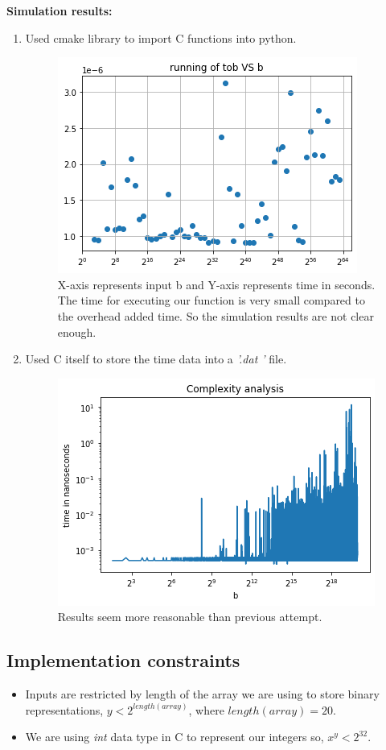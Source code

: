 \documentclass[journal,12pt,twocolumn]{IEEEtran}
\begin{document}
\textbf{Simulation results:} 
\begin{enumerate}
    \item Used cmake library to import C functions into python.
    \begin{figure}[]
        \centering
        \includegraphics[scale=0.5]{images/simulation.png}
        \caption{X-axis represents input b and Y-axis represents time in seconds. The time for executing our function is very small compared to the overhead added time. So the simulation results are not clear enough.}
        \label{simulation_1}
    \end{figure}
    \item Used C itself to store the time data into a \textit{'.dat '} file. 
    \begin{figure}[]
        \centering
        \includegraphics[scale=0.5]{images/simulation_2.png}
        \caption{Results seem more reasonable than previous attempt.}
        \label{simulation_2}
    \end{figure}
\end{enumerate}

\subsection{Implementation constraints}
\begin{itemize}
    \item Inputs are restricted by length of the array we are using to store binary representations, $y < 2^{length(array)}$, where $length(array)=20$.
    \item We are using \textit{int} data type in C to represent our integers so, $x^y < 2^{32}$.
\end{itemize}
\end{document}
